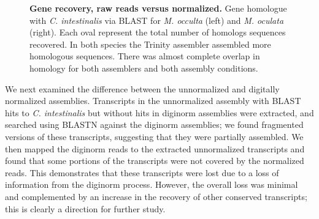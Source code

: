  \setcounter{subfigure}{0}
\begin{figure}[tbp]
	\begin{center}
	\end{center}
	\caption{\textbf{Gene recovery, raw reads versus normalized.} Gene homologue with \textit{C. intestinalis} via BLAST for \textit{M. occulta} (left) and \textit{M. oculata} (right). Each oval represent the total number of homologs sequences recovered. In both species the Trinity assembler assembled more homologous sequences. There was almost complete overlap in homology for both assemblers and both assembly conditions.}
	\label{fig:overlap}
\end{figure}
     
We next examined the difference between the unnormalized and digitally normalized assemblies. Transcripts in the unnormalized assembly with BLAST hits to \textit{C. intestinalis} but without hits in diginorm assemblies were extracted, and searched using BLASTN against the diginorm assemblies; we found fragmented versions of these transcripts, suggesting that they were partially assembled.  We then mapped the diginorm reads to the extracted unnormalized transcripts and found that some portions of the transcripts were not covered by the normalized reads. This demonstrates that these transcripts were lost due to a loss of information from the diginorm process.  However, the overall loss was minimal and complemented by an increase in the recovery of other conserved transcripts; this is clearly a direction for further study.
